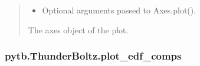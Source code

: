 \documentclass[letterpaper,10pt,english,openany,oneside]{sphinxmanual}
\begin{document}
\begin{fulllineitems}
\begin{fulllineitems}
\begin{quote}
\begin{description}
\begin{itemize}
\item {} 
\sphinxAtStartPar
{} \textendash{} Optional arguments passed to Axes.plot().

\end{itemize}

\sphinxAtStartPar
The axes object of the plot.

\sphinxAtStartPar
{}

\end{description}\end{quote}

\end{fulllineitems}


\sphinxstepscope


\subsubsection{pytb.ThunderBoltz.plot\_edf\_comps}
\label{\detokenize{api/pytb.ThunderBoltz.plot_edf_comps:pytb-thunderboltz-plot-edf-comps}}\label{\detokenize{api/pytb.ThunderBoltz.plot_edf_comps::doc}}


\end{fulllineitems}
\end{document}
